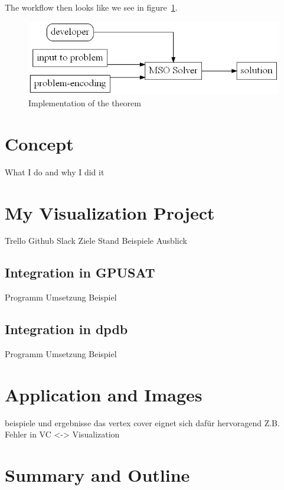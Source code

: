 \documentclass[a4paper, 12pt]{scrartcl}
\begin{document}
The workflow then looks like we see in figure~\ref{fig:UsageCourcelle}.

\begin{figure}[H]
	\includegraphics[height=0.2\textheight]{images/UsageCourcelle.gv.png}
	\caption{Implementation of the theorem}
	\label{fig:UsageCourcelle}
\end{figure}

\newpage
\section{Concept}
What I do and why I did it
\newpage
\section{My Visualization Project}
Trello
Github
Slack
Ziele
Stand 
Beispiele
Ausblick
\newpage
\subsection{Integration in GPUSAT}
Programm
Umsetzung
Beispiel
\newpage
\subsection{Integration in dpdb}
Programm
Umsetzung
Beispiel
\newpage
\section{Application and Images }
beispiele und ergebnisse das vertex cover eignet sich dafür hervoragend
Z.B. Fehler in VC <-> Visualization
\newpage
\section{Summary and Outline}

{}

\end{document}

